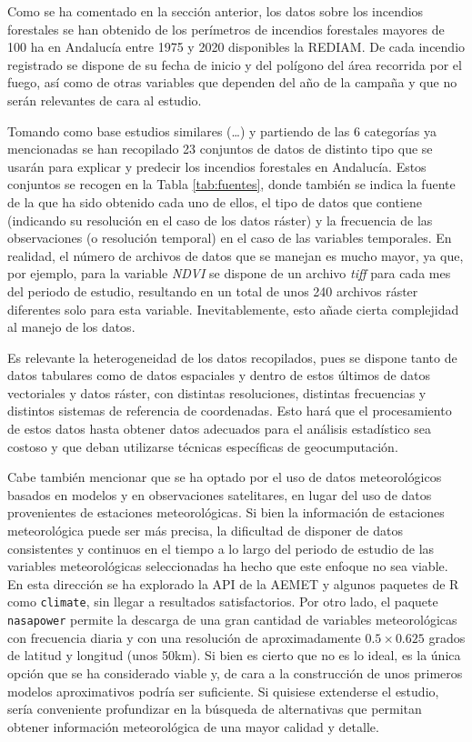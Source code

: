 \documentclass[12pt,a4paper,]{book}
\numberwithin{dummy}{section}
\theoremstyle{ocrenumbox}
\theoremstyle{blacknumex}
\theoremstyle{blacknumbox}
\theoremstyle{ocrenum}
\theoremstyle{ocrenum}
\begin{document}
Como se ha comentado en la sección anterior, los datos sobre los
incendios forestales se han obtenido de los perímetros de incendios
forestales mayores de 100 ha en Andalucía entre 1975 y 2020 disponibles
la REDIAM. De cada incendio registrado se dispone de su fecha de inicio
y del polígono del área recorrida por el fuego, así como de otras
variables que dependen del año de la campaña y que no serán relevantes
de cara al estudio.

Tomando como base estudios similares (\ldots) y partiendo de las 6
categorías ya mencionadas se han recopilado 23 conjuntos de datos de
distinto tipo que se usarán para explicar y predecir los incendios
forestales en Andalucía. Estos conjuntos se recogen en la Tabla
\ref{tab:fuentes}, donde también se indica la fuente de la que ha sido
obtenido cada uno de ellos, el tipo de datos que contiene (indicando su
resolución en el caso de los datos ráster) y la frecuencia de las
observaciones (o resolución temporal) en el caso de las variables
temporales. En realidad, el número de archivos de datos que se manejan
es mucho mayor, ya que, por ejemplo, para la variable \emph{NDVI} se
dispone de un archivo \emph{tiff} para cada mes del periodo de estudio,
resultando en un total de unos 240 archivos ráster diferentes solo para
esta variable. Inevitablemente, esto añade cierta complejidad al manejo
de los datos.

Es relevante la heterogeneidad de los datos recopilados, pues se dispone
tanto de datos tabulares como de datos espaciales y dentro de estos
últimos de datos vectoriales y datos ráster, con distintas resoluciones,
distintas frecuencias y distintos sistemas de referencia de coordenadas.
Esto hará que el procesamiento de estos datos hasta obtener datos
adecuados para el análisis estadístico sea costoso y que deban
utilizarse técnicas específicas de geocumputación.

Cabe también mencionar que se ha optado por el uso de datos
meteorológicos basados en modelos y en observaciones satelitares, en
lugar del uso de datos provenientes de estaciones meteorológicas. Si
bien la información de estaciones meteorológica puede ser más precisa,
la dificultad de disponer de datos consistentes y continuos en el tiempo
a lo largo del periodo de estudio de las variables meteorológicas
seleccionadas ha hecho que este enfoque no sea viable. En esta dirección
se ha explorado la API de la AEMET y algunos paquetes de R como
\texttt{climate}, sin llegar a resultados satisfactorios. Por otro lado,
el paquete \texttt{nasapower} permite la descarga de una gran cantidad
de variables meteorológicas con frecuencia diaria y con una resolución
de aproximadamente \(0.5 \times 0.625\) grados de latitud y longitud
(unos 50km). Si bien es cierto que no es lo ideal, es la única opción
que se ha considerado viable y, de cara a la construcción de unos
primeros modelos aproximativos podría ser suficiente. Si quisiese
extenderse el estudio, sería conveniente profundizar en la búsqueda de
alternativas que permitan obtener información meteorológica de una mayor
calidad y detalle.
\end{document}
